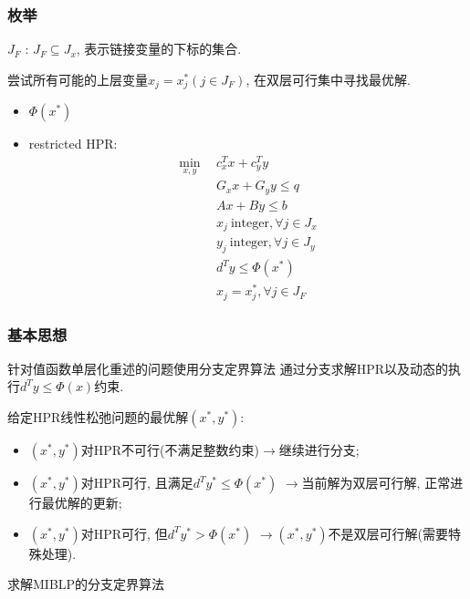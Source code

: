 \documentclass[10pt]{beamer}
\begin{document}
\begin{frame}
	\frametitle{枚举}
	\begin{definition}
		$J_F$ : $J_F\subseteq  J_x$, 表示链接变量的下标的集合.
	\end{definition}
	尝试所有可能的上层变量$x_j=x_j^*(j\in J_F)$, 在双层可行集中寻找最优解.
	\begin{itemize}
		\item $\Phi(x^*)$
		\item restricted HPR:
		\begin{subequations}
			\begin{align}
				\min_{x,y}~~&c_{x}^{T}x+c_{y}^{T}y \\
				&G_xx+G_yy \leq q  \\
				&Ax+By\leq b\\
				&x_{j}\mathrm{~integer}, \forall j\in J_{x}  \\
				&y_{j}\mathrm{~integer}, \forall j\in J_{y} \\
				&d^{T}y\leq \Phi(x^*) \\
				&x_j=x_j^*, \forall j\in J_F
			\end{align}
		\end{subequations}
	\end{itemize}
	
\end{frame}

\begin{frame}
	\frametitle{基本思想}
	\begin{block}{针对值函数单层化重述的问题使用分支定界算法}
		通过分支求解HPR以及动态的执行$d^Ty\leq\Phi(x)$约束.
	\end{block}
	给定HPR线性松弛问题的最优解$(x^*,y^*)$:
	\begin{itemize}
		\item $(x^*,y^*)$对HPR不可行(不满足整数约束)$\rightarrow$继续进行分支;
		\item $(x^*,y^*)$对HPR可行, 且满足$d^Ty^*\leq\Phi(x^*)$ $\rightarrow$当前解为双层可行解, 正常进行最优解的更新;
		\item $(x^*,y^*)$对HPR可行, 但$d^Ty^*>\Phi(x^*)$ $\rightarrow (x^*,y^*)$不是双层可行解(需要特殊处理).
	\end{itemize}
\end{frame}

\begin{frame}
	\begin{algorithm}[H]
		\caption{求解MIBLP的分支定界算法}
	\end{algorithm}
\end{frame}
\end{document}
